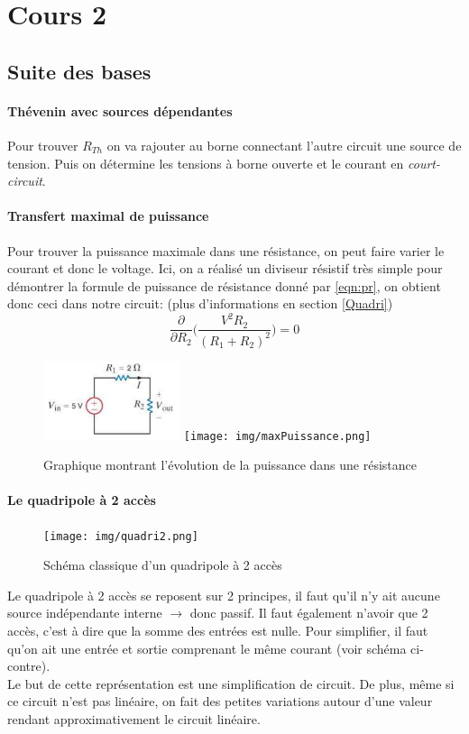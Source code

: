 \documentclass{report}
\begin{document}
\chapter{Cours 2}
\section{Suite des bases}
\subsubsection{Thévenin avec sources dépendantes}
Pour trouver $R_{Th}$ on va rajouter au borne connectant l'autre circuit une source de tension. Puis on détermine les tensions à borne ouverte et le courant en \textit{court-circuit}.

\subsubsection{Transfert maximal de puissance}
Pour trouver la puissance maximale dans une résistance, on peut faire varier le courant et donc le voltage. Ici, on a réalisé un diviseur résistif très simple pour démontrer la formule de puissance de résistance donné par \ref{eqn:pr}, on obtient donc ceci dans notre circuit: (plus d'informations en section \ref{Quadri})
\begin{equation}
\frac{\partial}{\partial R_2} \biggl(\frac{V^2 R_2}{(R_1 + R_2)^2}\biggl) = 0
\end{equation}

\begin{figure}[H]
\centering
\includegraphics[width=4cm]{img/puisCircuit.png}
\texttt{[image: img/maxPuissance.png]}
\caption{Graphique montrant l'évolution de la puissance dans une résistance}
\end{figure}

\subsubsection{Le quadripole à 2 accès}
\begin{figure}
\centering
\texttt{[image: img/quadri2.png]}
\caption{Schéma classique d'un quadripole à 2 accès}
\end{figure}
Le quadripole à 2 accès se reposent sur 2 principes, il faut qu'il n'y ait aucune source indépendante interne $\rightarrow$ donc passif. Il faut également n'avoir que 2 accès, c'est à dire que la somme des entrées est nulle. Pour simplifier, il faut qu'on ait une entrée et sortie comprenant le même courant (voir schéma ci-contre).\\
Le but de cette représentation est une simplification de circuit. De plus, même si ce circuit n'est pas linéaire, on fait des petites variations autour d'une valeur rendant approximativement le circuit linéaire.\\
\end{document}
